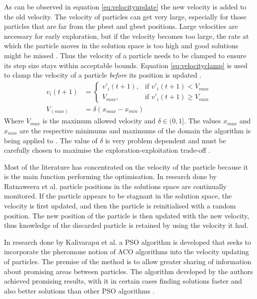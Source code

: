 As can be observed in equation \ref{eq:velocityupdate} the new velocity is added to the old velocity. The velocity of particles can get very large, especially for those particles that are far from the pbest and gbest positions. Large velocities are necessary for early exploration, but if the velocity becomes too large, the rate at which the particle moves in the solution space is too high and good solutions might be missed \cite{FundamentalSwarm}. Thus the velocity of a particle needs to be clamped to ensure its step size stays within acceptable bounds. Equation \ref{eq:velocityclamp} is used to clamp the velocity of a particle \emph{before} its position is updated \cite{FundamentalSwarm}.
\begin{align}
	v_i(t+1) &=
	\begin{cases}
	v'_i(t+1), &\text{if $v'_i(t+1) < V_{max}$}\\
	V_{max}, &\text{if $v'_i(t+1) \geq V_{max}$}
	\end{cases} \label{eq:velocityclamp}\\
	V_(max) &= \delta(x_{max} - x_{min})
\end{align}
Where $V_{max}$ is the maximum allowed velocity and $\delta \in (0,1]$. The values $x_{max}$ and $x_{min}$ are the respective minimums and maximums of the domain the algorithm is being applied to \cite{FundamentalSwarm}. The value of $\delta$ is very problem dependent and must be carefully chosen to maximise the exploration-exploitation trade-off \cite{FundamentalSwarm}. 

Most of the literature has concentrated on the velocity of the particle because it is the main function performing the optimisation. In research done by Ratnaweera et al.\cite{PSOSelfHierarch} particle positions in the solutions space are continually monitored. If the particle appears to be stagnant in the solution space, the velocity is first updated, and then the particle is reinitialised with a random position. The new position of the particle is then updated with the new velocity, thus knowledge of the discarded particle is retained by using the velocity it had\cite{PSOSelfHierarch}.

In research done by Kalivarapu et al. \cite{PSOPheromones} a PSO algorithm is developed that seeks to incorporate the pheromone notion of ACO algorithms into the velocity updating of particles. The premise of the method is to allow greater sharing of information about promising areas between particles. The algorithm developed by the authors achieved promising results, with it in certain cases finding solutions faster and also better solutions than other PSO algorithms \cite{PSOPheromones}. 

